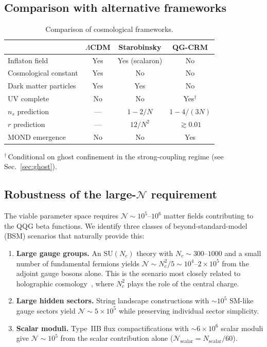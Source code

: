 \documentclass[aps,prd,twocolumn,superscriptaddress,nofootinbib]{revtex4-2}
\begin{document}
\subsection{Comparison with alternative frameworks}

\begin{table}[h]
\caption{Comparison of cosmological frameworks.}
\begin{tabular}{lccc}
\toprule
 & $\Lambda$CDM & Starobinsky & QG-CRM \\
\midrule
Inflaton field & Yes & Yes (scalaron) & No \\
Cosmological constant & Yes & No & No \\
Dark matter particles & Yes & Yes & No \\
UV complete & No & No & Yes$^\dagger$ \\
$n_s$ prediction & --- & $1-2/N$ & $1-4/(3N)$ \\
$r$ prediction & --- & $12/N^2$ & $\gtrsim 0.01$ \\
MOND emergence & No & No & Yes \\
\bottomrule
\end{tabular}
\label{tab:comparison}
\end{table}
\noindent$^\dagger$\,Conditional on ghost confinement in the strong-coupling regime (see Sec.~\ref{sec:ghost}).

\subsection{Robustness of the large-$\mathcal{N}$ requirement}
\label{sec:large-n}

The viable parameter space requires $\mathcal{N} \sim 10^5$--$10^6$ matter fields contributing to the QQG beta functions. We identify three classes of beyond-standard-model (BSM) scenarios that naturally provide this:

\begin{enumerate}
\item \textbf{Large gauge groups.} An $\mathrm{SU}(N_c)$ theory with $N_c \sim 300$--$1000$ and a small number of fundamental fermions yields $\mathcal{N} \sim N_c^2/5 \sim 10^4$--$2 \times 10^5$ from the adjoint gauge bosons alone. This is the scenario most closely related to holographic cosmology~\cite{Afshordi2017}, where $N_c^2$ plays the role of the central charge.

\item \textbf{Large hidden sectors.} String landscape constructions with $\sim 10^5$ SM-like gauge sectors yield $\mathcal{N} \sim 5 \times 10^5$ while preserving individual sector simplicity.

\item \textbf{Scalar moduli.} Type~IIB flux compactifications with $\sim 6 \times 10^6$ scalar moduli give $\mathcal{N} \sim 10^5$ from the scalar contribution alone ($\mathcal{N}_\mathrm{scalar} = N_\mathrm{scalar}/60$).
\end{enumerate}
\end{document}
